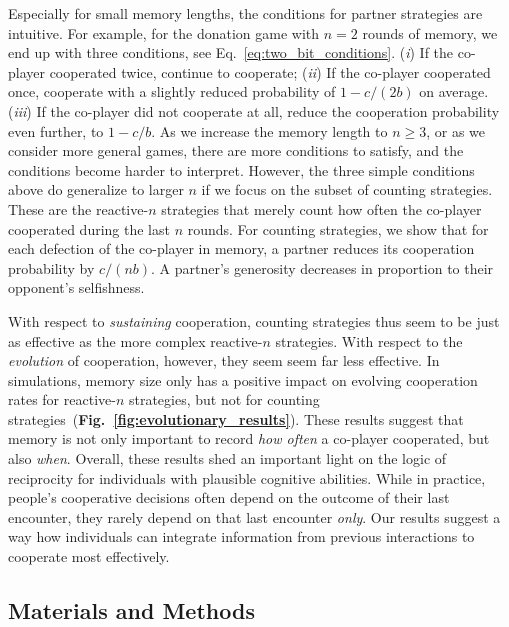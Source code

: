 \documentclass[11pt]{article}
\newcommand{\figref}[1]{{\textbf{Fig.~\ref{#1}}}}
\begin{document}
Especially for small memory lengths, the conditions for partner strategies are intuitive. 
For example, for the donation game with $n\!=\!2$ rounds of memory, we end up with three conditions, see Eq.~\eqref{eq:two_bit_conditions}.
({\it i}) If the co-player cooperated twice, continue to cooperate; 
({\it ii}) If the co-player cooperated once, cooperate with a slightly reduced probability of $1\!-\!c/(2b)$ on average. 
({\it iii}) If the co-player did not cooperate at all, reduce the cooperation probability even further, to $1\!-\!c/b$. 
As we increase the memory length to $n\!\ge\!3$, or as we consider more general games, there are more conditions to satisfy, and the conditions become harder to interpret. 
However, the three simple conditions above do generalize to larger $n$ if we focus on the subset of counting strategies. 
These are the reactive-$n$ strategies that merely count how often the co-player cooperated during the last $n$ rounds. 
For counting strategies, we show that for each defection of the co-player in memory, a partner reduces its cooperation probability by $c/(nb)$. 
A partner's generosity decreases in proportion to their opponent's selfishness. 

With respect to {\it sustaining} cooperation, counting strategies thus seem to be just as effective as the more complex reactive-$n$ strategies.
With respect to the {\it evolution} of cooperation, however, they seem seem far less effective. 
In simulations, memory size only has a positive impact on evolving cooperation rates for reactive-$n$ strategies, but not for counting strategies~(\figref{fig:evolutionary_results}). 
These results suggest that memory is not only important to record {\it how often} a co-player cooperated, but also {\it when}. 
Overall, these results shed an important light on the logic of reciprocity for individuals with plausible cognitive abilities. 
While in practice, people's cooperative decisions often depend on the outcome of their last encounter, they rarely depend on that last encounter {\it only}. 
Our results suggest a way how individuals can integrate information from previous interactions to cooperate most effectively.  





\subsection*{Materials and Methods}\label{section:materials_and_methods}
\end{document}
